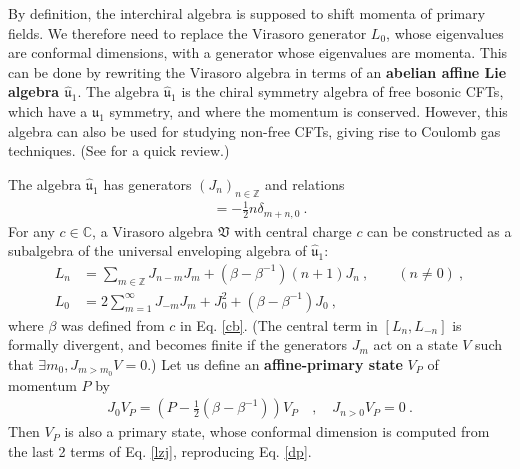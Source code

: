 \documentclass[12pt, a4paper]{article}
\newcommand{\myindex}[1]{\textbf{\boldmath #1}}
\begin{document}
By definition, the interchiral algebra is supposed to shift momenta of primary fields. We therefore need to replace the Virasoro generator $L_0$, whose eigenvalues are conformal dimensions, with a generator whose eigenvalues are momenta. This can be done by rewriting the Virasoro algebra in terms of an \myindex{abelian affine Lie algebra $\hat{\mathfrak{u}}_1$}. The algebra $\hat{\mathfrak{u}}_1$ is the chiral symmetry algebra of free bosonic CFTs, which have a $\mathfrak{u}_1$ symmetry, and where the momentum is conserved.
However, this algebra can also be used for studying non-free CFTs, giving rise to Coulomb gas techniques. (See \cite[Section 4.1]{rib14} for a quick review.)

The algebra $\hat{\mathfrak{u}}_1$ has generators $(J_n)_{n\in\mathbb{Z}}$ and relations 
\begin{align}
 [J_m,J_n] = -\frac12 n\delta_{m+n,0}\ . 
\end{align}
For any $c\in\mathbb{C}$, a Virasoro algebra $\mathfrak{V}$ with central charge $c$ can be constructed as a subalgebra of the universal enveloping algebra of $\hat{\mathfrak{u}}_1$:
\begin{subequations}
\begin{align}
 L_n &= \sum_{m\in{\mathbb{Z}}} J_{n-m}J_m + \left(\beta-\beta^{-1}\right)(n+1)J_n\ , \qquad (n\neq 0)\ ,
\label{lnj}
\\
L_0 &=2\sum_{m=1}^\infty J_{-m}J_m +J_0^2+\left(\beta-\beta^{-1}\right)J_0 \ ,
\label{lzj}
\end{align}
\end{subequations}
where $\beta$ was defined from $c$ in Eq. \eqref{cb}.
(The central term in $[L_n,L_{-n}]$ is formally divergent, and becomes finite if the generators $J_m$ act on a state $V$ such that $\exists m_0, J_{m>m_0}V=0$.)
Let us define an \textbf{affine-primary state} $V_P$ of momentum $P$ by
\begin{align}
 J_0 V_P  = \left(P-\tfrac12\left(\beta-\beta^{-1}\right) \right) V_P \quad , \quad J_{n>0} V_P = 0\ .
\end{align}
Then $V_P$ is also a primary state, whose conformal dimension is computed from the last 2 terms of Eq. \eqref{lzj}, reproducing Eq. \eqref{dp}.
\end{document}
